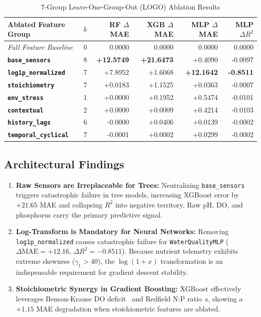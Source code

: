 \documentclass[conference]{IEEEtran}
\begin{document}
\begin{table}[!t]
  \caption{7-Group Leave-One-Group-Out (LOGO) Ablation Results}
  \label{tab:ablation}
  \centering
  \setlength{\tabcolsep}{2.5pt}
  \scriptsize
  \begin{tabular}{lrrrrr}
    \toprule
    \textbf{Ablated Feature Group} & \textbf{$k$}
      & \textbf{RF $\Delta$MAE} & \textbf{XGB $\Delta$MAE} & \textbf{MLP $\Delta$MAE} & \textbf{MLP $\Delta R^2$} \\
    \midrule
    \textit{Full Feature Baseline}  & 0 & 0.0000 & 0.0000 & 0.0000 & 0.0000 \\
    \textbf{\texttt{base\_sensors}}      & 8 & \textbf{+12.5749} & \textbf{+21.6473} & +0.4090 & -0.0097 \\
    \textbf{\texttt{log1p\_normalized}}  & 7 & +7.8952 & +1.6068 & \textbf{+12.1642} & \textbf{-0.8511} \\
    \textbf{\texttt{stoichiometry}}      & 7 & +0.0183 & +1.1525 & +0.0363 & -0.0007 \\
    \textbf{\texttt{env\_stress}}        & 1 & +0.0000 & +0.1952 & +0.5474 & -0.0101 \\
    \textbf{\texttt{contextual}}         & 2 & +0.0000 & +0.0009 & +0.4214 & -0.0103 \\
    \textbf{\texttt{history\_lags}}      & 6 & -0.0000 & +0.0406 & +0.0139 & -0.0002 \\
    \textbf{\texttt{temporal\_cyclical}} & 7 & -0.0001 & +0.0002 & +0.0299 & -0.0002 \\
    \bottomrule
  \end{tabular}
\end{table}

\subsection{Architectural Findings}
\begin{enumerate}
  \item \textbf{Raw Sensors are Irreplaceable for Trees:} Neutralizing \texttt{base\_sensors}
        triggers catastrophic failure in tree models, increasing XGBoost error by $+21.65$ MAE
        and collapsing $R^2$ into negative territory. Raw pH, DO, and phosphorus carry the
        primary predictive signal.
  \item \textbf{Log-Transform is Mandatory for Neural Networks:} Removing \texttt{log1p\_normalized}
        causes catastrophic failure for \texttt{WaterQualityMLP} ($\Delta\text{MAE} = +12.16$,
        $\Delta R^2 = -0.8511$). Because nutrient telemetry exhibits extreme skewness ($\gamma_1 > 40$),
        the $\log(1+x)$ transformation is an indispensable requirement for gradient descent stability.
  \item \textbf{Stoichiometric Synergy in Gradient Boosting:} XGBoost effectively leverages
        Benson-Krause DO deficit~\cite{benson1984concentration} and Redfield N:P ratio~\cite{redfield1934proportions}s, showing a $+1.15$ MAE degradation
        when stoichiometric features are ablated.
\end{enumerate}
\end{document}
